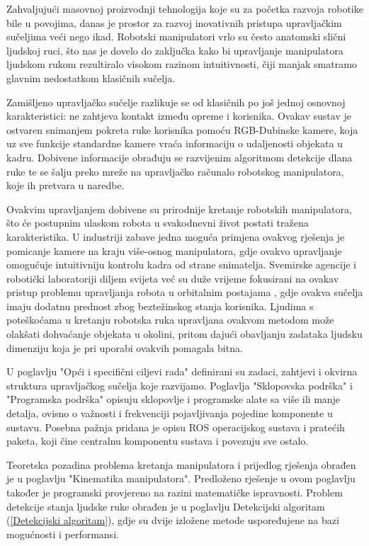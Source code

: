 \documentclass[times, utf8, diplomski, numeric]{fer}
\begin{document}
Zahvaljujući masovnoj proizvodnji tehnologija koje su za početka razvoja robotike bile u povojima, danas je prostor za razvoj inovativnih pristupa upravljačkim sučeljima veći nego ikad.
Robotski manipulatori vrlo su često anatomski slični ljudskoj ruci, što nas je dovelo do zaključka kako bi upravljanje manipulatora ljudskom rukom rezultiralo visokom razinom intuitivnosti, čiji manjak smatramo glavnim nedostatkom klasičnih sučelja.

Zamišljeno upravljačko sučelje razlikuje se od klasičnih po još jednoj osnovnoj karakteristici: ne zahtjeva kontakt između opreme i korisnika.
Ovakav sustav je ostvaren snimanjem pokreta ruke korisnika pomoću RGB-Dubinske kamere, koja uz sve funkcije standardne kamere vraća informaciju o udaljenosti objekata u kadru.
Dobivene informacije obrađuju se razvijenim algoritmom detekcije dlana ruke te se šalju preko mreže na upravljačko računalo robotskog manipulatora, koje ih pretvara u naredbe.

Ovakvim upravljanjem dobivene su prirodnije kretanje robotskih manipulatora, što će postupnim ulaskom robota u svakodnevni život postati tražena karakteristika.
U industriji zabave jedna moguća primjena ovakvog rješenja je pomicanje kamere na kraju više-osnog manipulatora, gdje ovakvo upravljanje omogućuje intuitivniju kontrolu kadra od strane snimatelja.
Svemirske agencije i robotički laboratoriji diljem svijeta već su duže vrijeme fokusirani na ovakav pristup problemu upravljanja robota u orbitalnim postajama \cite{yoshida2009achievements} \cite{larson1999human}, gdje ovakva sučelja imaju dodatnu prednost zbog beztežinskog stanja korisnika.
Ljudima s poteškoćama u kretanju robotska ruka upravljana ovakvom metodom može olakšati dohvaćanje objekata u okolini, pritom dajući obavljanju zadataka ljudsku dimenziju koja je pri uporabi ovakvih pomagala bitna.

U poglavlju "Opći i specifični ciljevi rada" definirani su zadaci, zahtjevi i okvirna struktura upravljačkog sučelja koje razvijamo.
Poglavlja "Sklopovska podrška" i "Programska podrška" opisuju sklopovlje i programske alate sa više ili manje detalja, ovisno o važnosti i frekvenciji pojavljivanja pojedine komponente u sustavu.
Posebna pažnja pridana je opisu ROS operacijskog sustava i pratećih paketa, koji čine centralnu komponentu sustava i povezuju sve ostalo.

Teoretska pozadina problema kretanja manipulatora i prijedlog rješenja obrađen je u poglavlju "Kinematika manipulatora".
Predloženo rješenje u ovom poglavlju također je programski provjereno na razini matematičke ispravnosti.
Problem detekcije stanja ljudske ruke obrađen je u poglavlju Detekcijski algoritam (\ref{Detekcijski algoritam}), gdje su dvije izložene metode uspoređujene na bazi mogućnosti i performansi.
\end{document}
